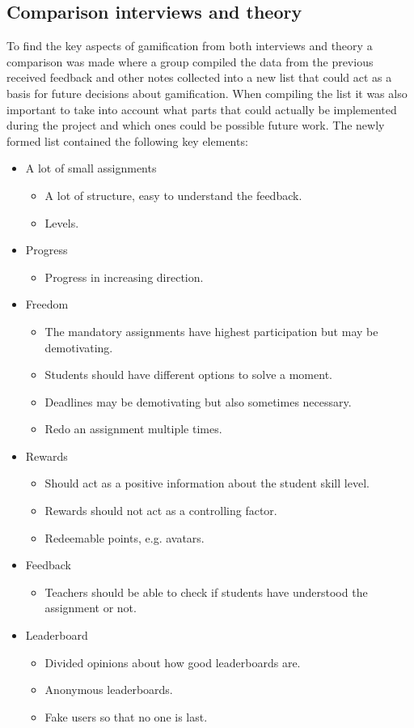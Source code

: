 \documentclass[a4paper,12pt]{article}
\begin{document}
\subsection{Comparison interviews and theory} 
To find the key aspects of gamification from both interviews and theory a comparison was made where a group compiled the data from the previous received feedback and other notes collected into a new list that could act as a basis for future decisions about gamification.
When compiling the list it was also important to take into account what parts that could actually be implemented during the project and which ones could be possible future work.
The newly formed list contained the following key elements:
\begin{itemize}
\item A lot of small assignments
\begin{itemize}
 \item A lot of structure, easy to understand the feedback.
 \item Levels.
\end{itemize}
\item Progress
\begin{itemize}
 \item Progress in increasing direction.
\end{itemize}
\item Freedom
\begin{itemize}
 \item The mandatory assignments have highest participation but may be demotivating.
 \item Students should have different options to solve a moment.
 \item Deadlines may be demotivating but also sometimes necessary.
 \item Redo an assignment multiple times.
\end{itemize}
\item Rewards
\begin{itemize}
 \item Should act as a positive information about the student skill level.
 \item Rewards should not act as a controlling factor.
 \item Redeemable points, e.g. avatars.
\end{itemize}
\item Feedback
\begin{itemize}
 \item Teachers should be able to check if students have understood the assignment or not.
\end{itemize}
\item Leaderboard
\begin{itemize}
 \item Divided opinions about how good leaderboards are.
 \item Anonymous leaderboards.
 \item Fake users so that no one is last.
\end{itemize}
\end{itemize}
\end{document}

